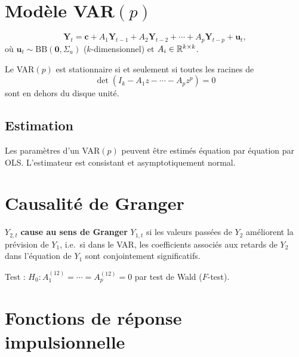 \section{Mod\`ele VAR$(p)$}

\begin{definition}[VAR$(p)$]
\[
\bm{Y}_t = \bm{c} + A_1\bm{Y}_{t-1} + A_2\bm{Y}_{t-2} + \cdots + A_p\bm{Y}_{t-p} + \bm{u}_t,
\]
o\`u $\bm{u}_t\sim\mathrm{BB}(\bm{0},\Sigma_u)$ ($k$-dimensionnel) et $A_i\in\mathbb{R}^{k\times k}$.
\end{definition}

\begin{theoreme}
Le VAR$(p)$ est stationnaire si et seulement si toutes les racines de
\[
\det(I_k - A_1 z - \cdots - A_p z^p) = 0
\]
sont en dehors du disque unit\'e.
\end{theoreme}

\subsection{Estimation}

\begin{theoreme}
Les param\`etres d'un VAR$(p)$ peuvent \^etre estim\'es \'equation par \'equation par OLS. L'estimateur est consistant et asymptotiquement normal.
\end{theoreme}

\section{Causalit\'e de Granger}

\begin{definition}
$Y_{2,t}$ \textbf{cause au sens de Granger} $Y_{1,t}$ si les valeurs pass\'ees de $Y_2$ am\'eliorent la pr\'evision de $Y_1$, i.e.\ si dans le VAR, les coefficients associ\'es aux retards de $Y_2$ dans l'\'equation de $Y_1$ sont conjointement significatifs.

Test : $H_0 : A_1^{(12)}=\cdots=A_p^{(12)}=0$ par test de Wald ($F$-test).
\end{definition}

\section{Fonctions de r\'eponse impulsionnelle}

